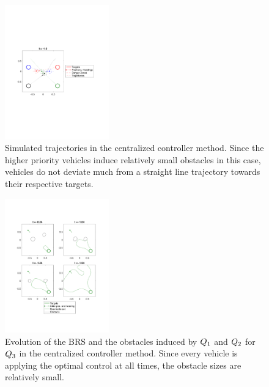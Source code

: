 \begin{figure}
  \centering
  \includegraphics[width=0.40\textwidth]{"fig/cc_traj"}
  \caption{Simulated trajectories in the centralized controller method. Since the higher priority vehicles induce relatively small obstacles in this case, vehicles do not deviate much from a straight line trajectory towards their respective targets.}
  \label{fig:cc_traj}
  \vspace{-1.4em}
\end{figure}

\begin{figure}[h]
  \centering
  \includegraphics[width=0.40\textwidth]{"fig/cc_rs3"}
  \caption{Evolution of the BRS and the obstacles induced by $Q_1$ and $Q_2$ for $Q_3$ in the centralized controller method. Since every vehicle is applying the optimal control at all times, the obstacle sizes are relatively small.}
  \label{fig:cc_rs3}
  \vspace{-1.2em}
\end{figure}
